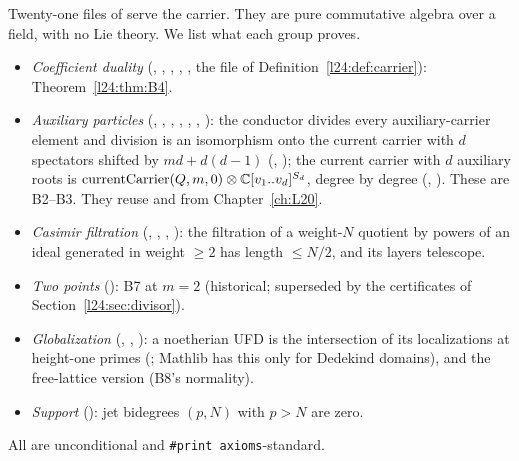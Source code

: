 Twenty-one files of  serve the carrier. They are pure commutative algebra over a
field, with no Lie theory. We list what each group proves.
\begin{itemize}
\item \emph{Coefficient duality} (, ,
  , , , the file of
  Definition~\ref{l24:def:carrier}): Theorem~\ref{l24:thm:B4}.
\item \emph{Auxiliary particles} (, ,
  , ,
  , ,
  ): the conductor divides every auxiliary-carrier element and division is
  an isomorphism onto the current carrier with $d$ spectators shifted by $md+d(d-1)$ (,
  ); the current carrier with $d$ auxiliary roots is
  $\mathrm{currentCarrier}(Q,m,0)\otimes{\mathbb{C}}[v_1..v_d]^{S_d}$, degree by degree (,
  ). These are B2--B3. They reuse  and
   from Chapter~\ref{ch:L20}.
\item \emph{Casimir filtration} (, ,
  , ): the filtration of a weight-$N$ quotient
  by powers of an ideal generated in weight $\ge2$ has length $\le N/2$, and its layers telescope.
\item \emph{Two points} (): B7 at $m=2$ (historical; superseded by the certificates
  of Section~\ref{l24:sec:divisor}).
\item \emph{Globalization} (, ,
  ): a noetherian UFD is the intersection of its localizations at height-one
  primes (; Mathlib has this only for Dedekind domains), and the free-lattice
  version (B8's normality).
\item \emph{Support} (): jet bidegrees $(p,N)$ with $p>N$ are zero.
\end{itemize}
All are unconditional and \texttt{\#print axioms}-standard.

